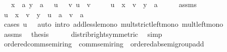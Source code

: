 \begin{isabellebody}
\ \ \ {\isachardoublequoteopen}x\ {\isacharless}{\kern0pt}\ a{\isachardoublequoteclose}\ {\isachardoublequoteopen}y\ {\isacharless}{\kern0pt}\ a{\isachardoublequoteclose}\ {\isachardoublequoteopen}{}\ {\isasymle}\ u{\isachardoublequoteclose}\ {\isachardoublequoteopen}{}\ {\isasymle}\ v{\isachardoublequoteclose}\ {\isachardoublequoteopen}u\ {\isacharplus}{\kern0pt}\ v\ {\isacharequal}{\kern0pt}\ {}{\isachardoublequoteclose}\isanewline
\ \ \ {\isachardoublequoteopen}u\ {\isacharasterisk}{\kern0pt}\ x\ {\isacharplus}{\kern0pt}\ v\ {\isacharasterisk}{\kern0pt}\ y\ {\isacharless}{\kern0pt}\ a{\isachardoublequoteclose}\isanewline
%
\isadelimproof
%
\endisadelimproof
%
\isatagproof
{}\isamarkupfalse%
\ {\isacharminus}{\kern0pt}\isanewline
\ \ \isamarkupfalse%
\ assms\ \isamarkupfalse%
\ {\isachardoublequoteopen}u\ {\isacharasterisk}{\kern0pt}\ x\ {\isacharplus}{\kern0pt}\ v\ {\isacharasterisk}{\kern0pt}\ y\ {\isacharless}{\kern0pt}\ u\ {\isacharasterisk}{\kern0pt}\ a\ {\isacharplus}{\kern0pt}\ v\ {\isacharasterisk}{\kern0pt}\ a{\isachardoublequoteclose}\isanewline
\ \ \ \ \isamarkupfalse%
\ {\isacharparenleft}{\kern0pt}cases\ {\isachardoublequoteopen}u\ {\isacharequal}{\kern0pt}\ {}{\isachardoublequoteclose}{\isacharparenright}{\kern0pt}\ {\isacharparenleft}{\kern0pt}auto\ intro{\isacharbang}{\kern0pt}{\isacharcolon}{\kern0pt}\ add{\isacharunderscore}{\kern0pt}less{\isacharunderscore}{\kern0pt}le{\isacharunderscore}{\kern0pt}mono\ mult{\isacharunderscore}{\kern0pt}strict{\isacharunderscore}{\kern0pt}left{\isacharunderscore}{\kern0pt}mono\ mult{\isacharunderscore}{\kern0pt}left{\isacharunderscore}{\kern0pt}mono{\isacharparenright}{\kern0pt}\isanewline
\ \ \isamarkupfalse%
\ assms\ \isamarkupfalse%
\ {\isacharquery}{\kern0pt}thesis\isanewline
\ \ \ \ \isamarkupfalse%
\ distrib{\isacharunderscore}{\kern0pt}right{\isacharbrackleft}{\kern0pt}symmetric{\isacharbrackright}{\kern0pt}\ \isamarkupfalse%
\ simp\isanewline
{}\isamarkupfalse%
%
\endisatagproof
{\isafoldproof}%
%
\isadelimproof
\isanewline
%
\endisadelimproof
\isanewline
{}\isamarkupfalse%
\isanewline
\isanewline
{}\isamarkupfalse%
\ ordered{\isacharunderscore}{\kern0pt}comm{\isacharunderscore}{\kern0pt}semiring\ {\isacharequal}{\kern0pt}\ comm{\isacharunderscore}{\kern0pt}semiring{\isacharunderscore}{\kern0pt}{}\ {\isacharplus}{\kern0pt}\ ordered{\isacharunderscore}{\kern0pt}ab{\isacharunderscore}{\kern0pt}semigroup{\isacharunderscore}{\kern0pt}add\ {\isacharplus}{\kern0pt}\isanewline

\end{isabellebody}

